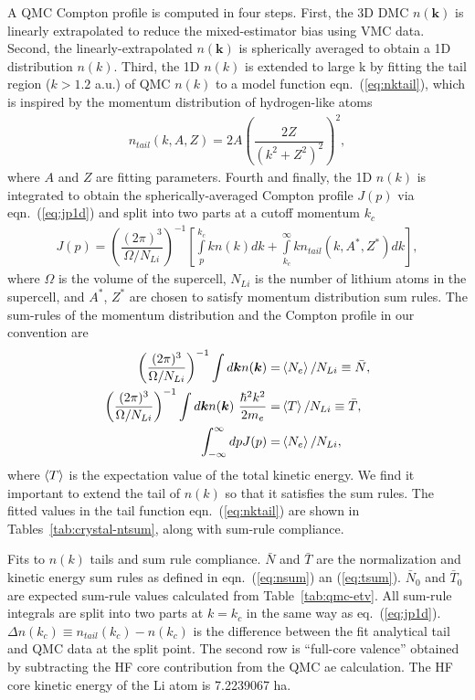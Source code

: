 \documentclass[aps,prl,superscriptaddress]{revtex4-1}
\newcommand{\bs}{\boldsymbol}
\begin{document}
A QMC Compton profile is computed in four steps. First, the 3D DMC $n(\bs{k})$ is linearly extrapolated to reduce the mixed-estimator bias using VMC data. Second, the linearly-extrapolated $n(\bs{k})$ is spherically averaged to obtain a 1D distribution $n(k)$. Third, the 1D $n(k)$ is extended to large k by fitting the tail region ($k > 1.2$ a.u.) of QMC $n(k)$ to a model function eqn.~(\ref{eq:nktail}), which is inspired by the momentum distribution of hydrogen-like atoms
\begin{align} \label{eq:nktail}
n_{tail}(k, A, Z) = 2A\left(\dfrac{2Z}{(k^2+Z^2)^2}\right)^2,
\end{align}
where $A$ and $Z$ are fitting parameters. Fourth and finally, the 1D $n(k)$ is integrated to obtain the spherically-averaged Compton profile $J(p)$ via eqn.~(\ref{eq:jp1d}) and split into two parts at a cutoff momentum $k_c$
\begin{align} \label{eq:jp1d}
J(p) = \left( \dfrac{(2\pi)^3}{\Omega/N_{Li}} \right)^{-1} \left[
\int\limits_p^{k_c} k n(k) dk + \int\limits_{k_c}^{\infty} k n_{tail}(k, A^*, Z^*) dk
\right],
\end{align}
where $\Omega$ is the volume of the supercell, $N_{Li}$ is the number of lithium atoms in the supercell, and $A^*$, $Z^*$ are chosen to satisfy momentum distribution sum rules. %
The sum-rules of the momentum distribution and the Compton profile in our convention are
\begin{align}
\left( \dfrac{(2\pi)^3}{\Omega/N_{Li}} \right)^{-1} \int d\bs{k} n(\bs{k}) =& \braket{N_e}/N_{Li}\equiv \bar{N}, \label{eq:nsum} \\
\left( \dfrac{(2\pi)^3}{\Omega/N_{Li}} \right)^{-1} \int d\bs{k} n(\bs{k})~\frac{\hbar^2k^2}{2m_e} =& \braket{T}/N_{Li} \equiv \bar{T}, \label{eq:tsum} \\
\int_{-\infty}^{\infty} dp J(p) =& \braket{N_e}/N_{Li}, \label{eq:jpsum}
\end{align}
where $\braket{T}$ is the expectation value of the total kinetic energy. We find it important to extend the tail of $n(k)$ so that it satisfies the sum rules. The fitted values in the tail function eqn.~(\ref{eq:nktail}) are shown in Tables~\ref{tab:crystal-ntsum}, along with sum-rule compliance.

\begin{table}[h]
\caption{Fits to $n(k)$ tails and sum rule compliance. $\bar{N}$ and $\bar{T}$ are the normalization and kinetic energy sum rules as defined in eqn.~(\ref{eq:nsum}) an (\ref{eq:tsum}). $\bar{N}_0$ and $\bar{T}_0$ are expected sum-rule values calculated from Table~\ref{tab:qmc-etv}. All sum-rule integrals are split into two parts at $k=k_c$ in the same way as eq.~(\ref{eq:jp1d}). $\Delta n(k_c)\equiv n_{tail}(k_c)-n(k_c)$ is the difference between the fit analytical tail and QMC data at the split point. The second row is ``full-core valence'' obtained by subtracting the HF core contribution from the QMC ae calculation. The HF core kinetic energy of the Li atom is 7.2239067 ha.}

\label{tab:crystal-ntsum}
\end{table}
\end{document}
